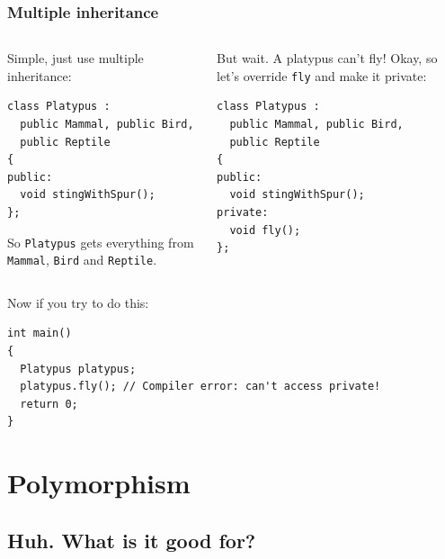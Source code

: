 \documentclass[handout]{beamer}
\begin{document}
\begin{frame}[fragile]
  \frametitle{Multiple inheritance}
  
  \begin{columns}[t]
    \begin{column}[T]{0.49\linewidth}
  		Simple, just use multiple inheritance:
  		\begin{lstlisting}
class Platypus :
  public Mammal, public Bird,
  public Reptile
{
public:
  void stingWithSpur();
};
  		\end{lstlisting}
  		So \texttt{Platypus} gets everything from \texttt{Mammal}, \texttt{Bird} and \texttt{Reptile}.
  	\end{column}
  	\pause
  	\begin{column}[T]{0.49\linewidth}
	  	But wait.  A platypus can't fly! \pause{}  Okay, so let's override \texttt{fly} and make it private:
		  \begin{lstlisting}
class Platypus :
  public Mammal, public Bird,
  public Reptile
{
public:
  void stingWithSpur();
private:
  void fly();
};
  		\end{lstlisting}  
  	\end{column}
  \end{columns}
  \pause
  		Now if you try to do this:
  		\begin{lstlisting}[belowskip=0pt]
int main()
{
  Platypus platypus;
  platypus.fly(); // Compiler error: can't access private!
  return 0;
}
  		\end{lstlisting}
  

\end{frame}

\section{Polymorphism}

\subsection{Huh.  What is it good for?}
\end{document}
